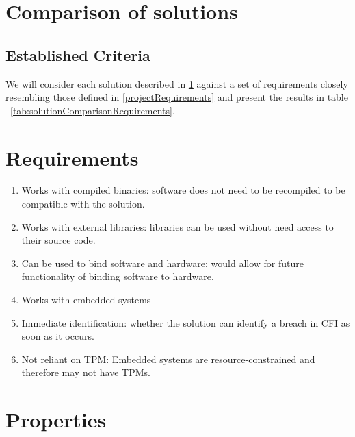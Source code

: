 \section{Comparison of solutions} \label{comparisonOfCFISolutions}

\subsection{Established Criteria}\label{requirementsIntro}

We will consider each solution described in \ref{comparisonOfCFISolutions} against a set of requirements closely resembling those defined in \ref{projectRequirements} and present the results in table ~\ref{tab:solutionComparisonRequirements}.

\section{Requirements}\label{Requirements}

\begin{enumerate}[ {(}1{)} ]
	\item Works with compiled binaries: software does not need to be recompiled to be compatible with the solution.
	\item Works with external libraries: libraries can be used without need access to their source code.
	\item Can be used to bind software and hardware: would allow for future functionality of binding software to hardware.
	\item Works with embedded systems
	\item Immediate identification: whether the solution can identify a breach in CFI as soon as it occurs.
	\item Not reliant on TPM: Embedded systems are resource-constrained and therefore may not have TPMs.
\end{enumerate}

\section{Properties}\label{Properties}

